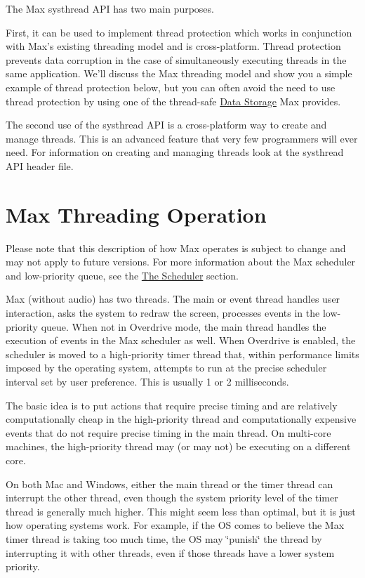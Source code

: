 The Max systhread API has two main purposes.

First, it can be used to implement thread protection which works in conjunction with Max's existing threading model and is cross-\/platform. Thread protection prevents data corruption in the case of simultaneously executing threads in the same application. We'll discuss the Max threading model and show you a simple example of thread protection below, but you can often avoid the need to use thread protection by using one of the thread-\/safe \hyperlink{group__datastore}{Data Storage} Max provides.

The second use of the systhread API is a cross-\/platform way to create and manage threads. This is an advanced feature that very few programmers will ever need. For information on creating and managing threads look at the systhread API header file.\hypertarget{chapter_threading_chapter_threading_op}{}\section{Max Threading Operation}\label{chapter_threading_chapter_threading_op}
Please note that this description of how Max operates is subject to change and may not apply to future versions. For more information about the Max scheduler and low-\/priority queue, see the \hyperlink{chapter_scheduler}{The Scheduler} section.

Max (without audio) has two threads. The main or event thread handles user interaction, asks the system to redraw the screen, processes events in the low-\/priority queue. When not in Overdrive mode, the main thread handles the execution of events in the Max scheduler as well. When Overdrive is enabled, the scheduler is moved to a high-\/priority timer thread that, within performance limits imposed by the operating system, attempts to run at the precise scheduler interval set by user preference. This is usually 1 or 2 milliseconds.

The basic idea is to put actions that require precise timing and are relatively computationally cheap in the high-\/priority thread and computationally expensive events that do not require precise timing in the main thread. On multi-\/core machines, the high-\/priority thread may (or may not) be executing on a different core.

On both Mac and Windows, either the main thread or the timer thread can interrupt the other thread, even though the system priority level of the timer thread is generally much higher. This might seem less than optimal, but it is just how operating systems work. For example, if the OS comes to believe the Max timer thread is taking too much time, the OS may \char`\"{}punish\char`\"{} the thread by interrupting it with other threads, even if those threads have a lower system priority.

